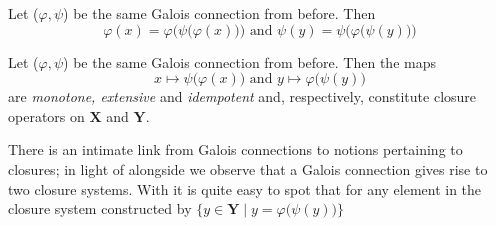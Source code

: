 \begin{proposition}
  \label{proposition:galois-idem} Let ($\varphi, \psi$) be the same Galois connection from before. Then
  \[
    \varphi (x) = \varphi \Big( \psi \big( \varphi (x)\big) \Big) \text{ and }\psi (y) = \psi \Big( \varphi \big( \psi (y)\big) \Big)
  \]
\end{proposition}

\begin{proposition}
  \label{proposition:galois-connections-closure-operators} Let ($\varphi, \psi$) be the same Galois connection from before. Then the maps
  \[
    x \mapsto \psi \big(\varphi(x)\big) \text{ and }y \mapsto \varphi \big(\psi (y)\big)
  \]
  are \textit{monotone, extensive} and \textit{idempotent} and, respectively, constitute closure operators on $\mathbf{X}$ and $\mathbf{Y}$.
\end{proposition}

There is an intimate link from Galois connections to notions pertaining to closures; in light of  alongside
 we observe that a Galois connection gives rise to two closure systems. With  it is quite easy to spot that for
any element in the closure system constructed by $\{y \in \mathbf{Y}\mid y = \varphi \big(\psi(y)\big)\}$

